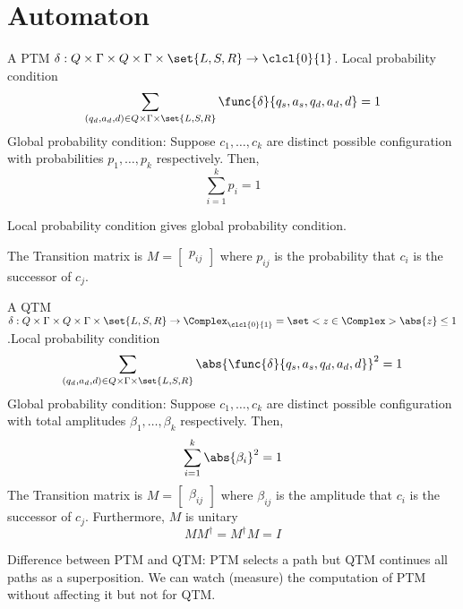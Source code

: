 \chapter{Automaton}
A PTM \(\delta: Q \times \Gamma \times Q \times \Gamma \times \set{L,S,R} \to \clcl{0}{1}\). Local probability condition
\begin{equation*}
    \sum_{(q_d,a_d,d) \in Q \times \Gamma \times \set{L,S,R}} \func{\delta}{q_s,a_s,q_d,a_d,d} = 1
\end{equation*}
Global probability condition: Suppose \(c_1, \dots, c_k\) are distinct possible configuration with probabilities \(p_1, \dots, p_k\) respectively. Then, 
\begin{equation*}
    \sum_{i = 1}^k p_i = 1
\end{equation*}
\begin{proposition}
    Local probability condition gives global probability condition.
\end{proposition}
The Transition matrix is \(M = \begin{bmatrix}
    p_{ij}
\end{bmatrix}\) where \(p_{ij}\) is the probability that \(c_i\) is the successor of \(c_j\).

A QTM \(\delta: Q \times \Gamma \times Q \times \Gamma \times \set{L,S,R} \to \Complex_{\clcl{0}{1}} = \set<z \in \Complex>{\abs{z} \leq 1}\).Local probability condition
\begin{equation*}
    \sum_{(q_d,a_d,d) \in Q \times \Gamma \times \set{L,S,R}} \abs{\func{\delta}{q_s,a_s,q_d,a_d,d}}^2 = 1
\end{equation*}
Global probability condition: Suppose \(c_1, \dots, c_k\) are distinct possible configuration with total amplitudes \(\beta_1, \dots, \beta_k\) respectively. Then, 
\begin{equation*}
    \sum_{i = 1}^k \abs{\beta_i}^2 = 1
\end{equation*}
The Transition matrix is \(M = \begin{bmatrix}
    \beta_{ij}
\end{bmatrix}\) where \(\beta_{ij}\) is the amplitude that \(c_i\) is the successor of \(c_j\). Furthermore, \(M\) is unitary
\begin{equation*}
    M M^{\dagger} = M^{\dagger} M = I
\end{equation*}

Difference between PTM and QTM: PTM selects a path but QTM continues all paths as a superposition. We can watch (measure) the computation of PTM without affecting it but not for QTM.
